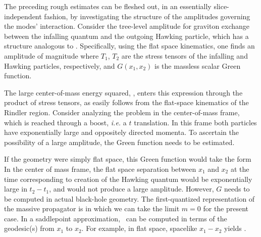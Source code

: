 
The preceding rough estimates can be fleshed out, in an essentially slice-independent fashion, by investigating the structure of the amplitudes governing the modes' interaction.  Consider the tree-level amplitude for graviton exchange between the infalling quantum and the outgoing Hawking particle, which has a structure analogous to \gravamp.  Specifically, using the flat space kinematics, one finds an amplitude of magnitude
%
\eqn{}
%
where $T_1$, $T_2$ are the stress tensors of the infalling and Hawking particles, respectively, and $G(x_1,x_2)$ is the massless scalar Green function.


The large center-of-mass energy squared, \largeinvt, enters this expression through the product of stress tensors, as easily follows from the flat-space kinematics of the Rindler region.  Consider analyzing the problem in the center-of-mass frame, which is reached through a boost, {\it i.e.} a $t$ translation.  In this frame both particles have exponentially large and oppositely directed momenta. 
To ascertain the possibility of a large amplitude, the Green function needs to be estimated.

If the geometry were simply flat space, this Green function would take the form 
%
\eqn{}
%
In the center of mass frame, the flat space separation between $x_1$ and $x_2$ at the time corresponding to creation of the Hawking quantum 
would be exponentially large in $t_2-t_1$, and would not produce a large amplitude.  However, $G$ needs to be computed in actual black-hole geometry.  The first-quantized representation of the massive propagator is
%
\eqn{}
%
in which we can take the limit $m=0$ for the present case.   In a saddlepoint approximation, \mgreen\ can be computed in terms of the geodesic(s) from $x_1$ to $x_2$.  For example, in flat space, spacelike $x_1-x_2$ yields \flatgreen.  

